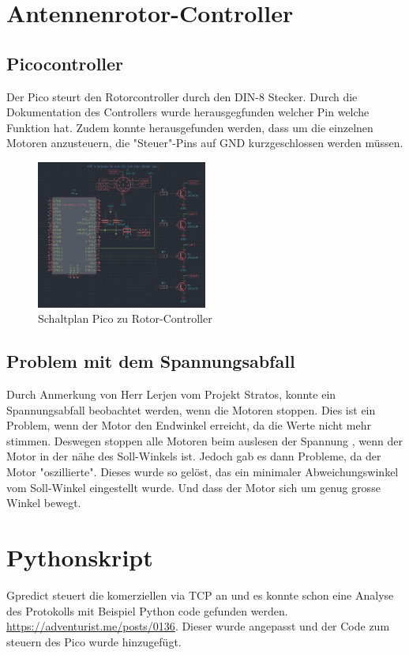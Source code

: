 \documentclass{article}
\begin{document}
\section*{Antennenrotor-Controller}
\subsection*{Picocontroller}
Der Pico steurt den Rotorcontroller durch den DIN-8 Stecker. Durch die Dokumentation des Controllers wurde herausgegfunden welcher Pin welche Funktion hat. Zudem konnte herausgefunden werden, dass um die einzelnen Motoren anzusteuern, die "Steuer"-Pins auf GND kurzgeschlossen werden müssen.

\begin{figure}[h]
\includegraphics[width=0.5\textwidth]{Wiring}
\centering 
\caption{Schaltplan Pico zu Rotor-Controller}
\end{figure}

\subsection*{Problem mit dem Spannungsabfall}
Durch Anmerkung von Herr Lerjen vom Projekt Stratos, konnte ein Spannungsabfall beobachtet werden, wenn die Motoren stoppen. Dies ist ein Problem, wenn der Motor den Endwinkel erreicht, da die Werte nicht mehr stimmen. Deswegen stoppen alle Motoren beim auslesen der Spannung , wenn der Motor in der nähe des Soll-Winkels ist. Jedoch gab es dann Probleme, da der Motor "oszillierte". Dieses wurde so gelöst, das ein minimaler Abweichungswinkel vom Soll-Winkel eingestellt wurde. Und dass der Motor sich um genug grosse Winkel bewegt.

\section*{Pythonskript}
Gpredict steuert die komerziellen via TCP an und es konnte schon eine Analyse des Protokolls mit Beispiel Python code gefunden werden. \href{https://adventurist.me/posts/0136}{https://adventurist.me/posts/0136}. Dieser wurde angepasst und der Code zum steuern des Pico wurde hinzugefügt.
\end{document}
